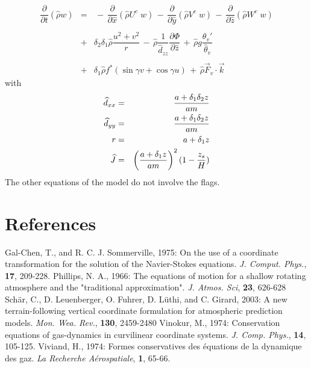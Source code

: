 \begin{eqnarray}
\\
& & \nonumber \\
\dfrac{\partial}{\partial t}(\widehat{\rho} w) &= &
 \, - \, \dfrac{\partial }{\partial \widehat{x}} (\widehat{\rho} U^{c }\;    w)
 \, - \, \dfrac{\partial }{\partial \widehat{y}} (\widehat{\rho} V^{c }\;   w )
 \, - \, \dfrac{\partial }{\partial \widehat{z}} (\widehat{\rho} W^{c }\;  w)
\nonumber \\ & & \nonumber \\
 & + & \delta _{2}\delta _{1}\widehat{\rho}\dfrac{ u ^{2}+ v ^{2} }{r}
 \,  - \, \widehat{\rho}\dfrac{1}{\widehat{d}_{zz}} \dfrac{\partial \Phi}{\partial \widehat{z}}
\, + \,\widehat{\rho} g \dfrac{\theta_v ' }{\widehat{\theta}_v}\nonumber \\
& & \nonumber \\
&  + &\delta _{1}\widehat{\rho} f^{*}(\sin\gamma  v  + \cos\gamma  u )
 \, + \, \widehat{\rho} \vec{F}_{v} \cdot \vec{k}
 \end{eqnarray}
with
\begin{eqnarray}
\widehat{d}_{xx}&=&\dfrac{a+\delta_1 \delta_2 z}{am} \nonumber \\
\widehat{d}_{yy}&=&\dfrac{a+\delta_1 \delta_2 z}{am} \nonumber \\
r &=& a + \delta_1 z \\
\widehat{J} &=& \left( \dfrac{a+\delta_1 z}{am} \right)^2 (1 - {z_s \over H }) \nonumber
\end{eqnarray}
The other equations of the model do not involve the flags.


\section{References}
\decrefname
Gal-Chen, T., and R. C. J. Sommerville, 1975:
On the use of a coordinate transformation for the solution
of the Navier-Stokes equations.
{\it J. Comput. Phys.}, {\bf 17}, 209-228.
\decrefname
Phillips, N. A., 1966:
The equations of motion for a shallow rotating atmosphere and the "traditional approximation".
{\it J. Atmos. Sci}, {\bf 23}, 626-628
\decrefname
Sch\"ar,  C., D. Leuenberger,  O. Fuhrer,  D. L\"uthi, and C. Girard, 2003:
A new terrain-following vertical coordinate formulation
for atmospheric prediction models.
{\it Mon. Wea. Rev.}, {\bf 130}, 2459-2480 
\decrefname
Vinokur, M., 1974:
Conservation equations of gas-dynamics in curvilinear coordinate systems.
{\it J. Comp. Phys.}, {\bf 14},  105-125.
\decrefname
Viviand, H., 1974:
Formes conservatives des \'equations de la dynamique des gaz.
{\it La Recherche A\'erospatiale}, {\bf 1}, 65-66.

